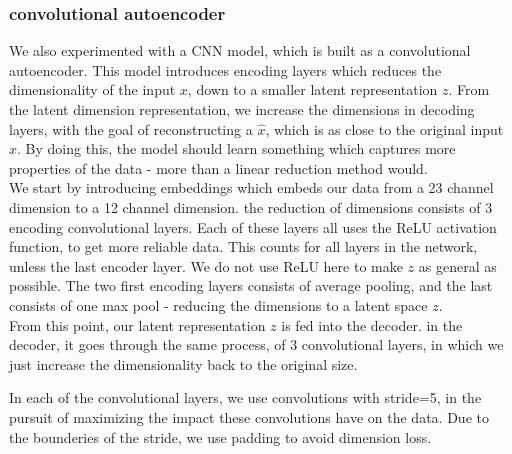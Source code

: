 \subsubsection{convolutional autoencoder}

We also experimented with a CNN model, which is built as a convolutional autoencoder. This model introduces encoding layers which reduces the dimensionality of the input $x$, down to a smaller latent representation $z$. From the latent dimension representation, we increase the dimensions in decoding layers, with the goal of reconstructing a $\hat{x}$, which is as close to the original input $x$. By doing this, the model should learn something which captures more properties of the data - more than a linear reduction method would. \\

We start by introducing embeddings which embeds our data from a 23 channel dimension to a 12 channel dimension. the reduction of dimensions consists of 3 encoding convolutional layers. Each of these layers all uses the ReLU activation function, to get more reliable data. This counts for all layers in the network, unless the last encoder layer. We do not use ReLU here to make $z$ as general as possible. The two first encoding layers consists of average pooling, and the last consists of one max pool - reducing the dimensions to a latent space $z$.  \\


\noindent
From this point, our latent representation $z$ is fed into the decoder. in the decoder, it goes through the same process, of 3 convolutional layers, in which we just increase the dimensionality back to the original size.

\noindent
In each of the convolutional layers, we use convolutions with stride=5, in the pursuit of maximizing the impact these convolutions have on the data. Due to the bounderies of the stride, we use padding to avoid dimension loss.\\



